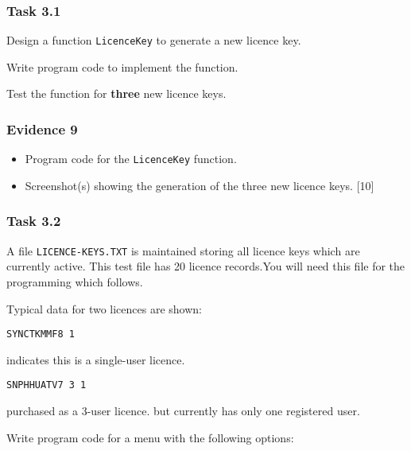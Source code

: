 \subsubsection*{Task 3.1}

Design a function \texttt{LicenceKey} to generate a new licence key. 

Write program code to implement the function. 

Test the function for \textbf{three} new licence keys. 

\subsubsection*{Evidence 9}
\begin{itemize}
\item Program code for the \texttt{LicenceKey} function. 
\item Screenshot(s) showing the generation of the three new licence keys.
\hfill{}{[}10{]}
\end{itemize}

\subsubsection*{Task 3.2}

A file \texttt{LICENCE-KEYS.TXT} is maintained storing all licence
keys which are currently active. This test file has 20 licence records.You
will need this file for the programming which follows. 

Typical data for two licences are shown: 

\texttt{SYNCTKMMF8 1}

indicates this is a single-user licence. 

\texttt{SNPHHUATV7 3 1} 

purchased as a 3-user licence. but currently has only one registered
user. 

Write program code for a menu with the following options: 
\begin{center}
\noindent{}
\par\end{center}

